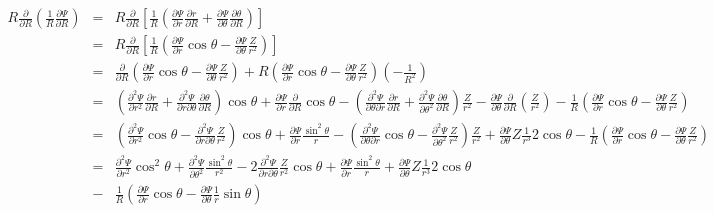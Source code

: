 \documentclass{llncs}
\begin{document}
\begin{eqnarray}
  R \frac{\partial}{\partial R} \left( \frac{1}{R} \frac{\partial
  \Psi}{\partial R} \right) & = & R \frac{\partial}{\partial R} \left[
  \frac{1}{R} \left( \frac{\partial \Psi}{\partial r}  \frac{\partial
  r}{\partial R} + \frac{\partial \Psi}{\partial \theta}  \frac{\partial
  \theta}{\partial R} \right) \right] \nonumber\\
  & = & R \frac{\partial}{\partial R} \left[ \frac{1}{R} \left(
  \frac{\partial \Psi}{\partial r} \cos \theta - \frac{\partial \Psi}{\partial
  \theta}  \frac{Z}{r^2} \right) \right] \nonumber\\
  & = & \frac{\partial}{\partial R} \left( \frac{\partial \Psi}{\partial r}
  \cos \theta - \frac{\partial \Psi}{\partial \theta}  \frac{Z}{r^2} \right) +
  R \left( \frac{\partial \Psi}{\partial r} \cos \theta - \frac{\partial
  \Psi}{\partial \theta}  \frac{Z}{r^2} \right) \left( - \frac{1}{R^2} \right)
  \nonumber\\
  & = & \left( \frac{\partial^2 \Psi}{\partial r^2} \frac{\partial
  r}{\partial R} + \frac{\partial^2 \Psi}{\partial r \partial \theta}
  \frac{\partial \theta}{\partial R} \right) \cos \theta + \frac{\partial
  \Psi}{\partial r} \frac{\partial}{\partial R} \cos \theta - \left(
  \frac{\partial^2 \Psi}{\partial \theta \partial r} \frac{\partial
  r}{\partial R} + \frac{\partial^2 \Psi}{\partial \theta^2} \frac{\partial
  \theta}{\partial R} \right) \frac{Z}{r^2} - \frac{\partial \Psi}{\partial
  \theta} \frac{\partial}{\partial R} \left( \frac{Z}{r^2} \right) -
  \frac{1}{R} \left( \frac{\partial \Psi}{\partial r} \cos \theta -
  \frac{\partial \Psi}{\partial \theta}  \frac{Z}{r^2} \right) \nonumber\\
  & = & \left( \frac{\partial^2 \Psi}{\partial r^2} \cos \theta -
  \frac{\partial^2 \Psi}{\partial r \partial \theta}  \frac{Z}{r^2} \right)
  \cos \theta + \frac{\partial \Psi}{\partial r}  \frac{\sin^2 \theta}{r} -
  \left( \frac{\partial^2 \Psi}{\partial \theta \partial r} \cos \theta -
  \frac{\partial^2 \Psi}{\partial \theta^2} \frac{Z}{r^2} \right)
  \frac{Z}{r^2} + \frac{\partial \Psi}{\partial \theta} Z \frac{1}{r^3} 2 \cos
  \theta - \frac{1}{R} \left( \frac{\partial \Psi}{\partial r} \cos \theta -
  \frac{\partial \Psi}{\partial \theta}  \frac{Z}{r^2} \right) \nonumber\\
  & = & \frac{\partial^2 \Psi}{\partial r^2} \cos^2 \theta + \frac{\partial^2
  \Psi}{\partial \theta^2}  \frac{\sin^2 \theta}{r^2} - 2 \frac{\partial^2
  \Psi}{\partial r \partial \theta}  \frac{Z}{r^2} \cos \theta +
  \frac{\partial \Psi}{\partial r}  \frac{\sin^2 \theta}{r} + \frac{\partial
  \Psi}{\partial \theta} Z \frac{1}{r^3} 2 \cos \theta  \label{9-17-e3}\\
  & - & \frac{1}{R} \left( \frac{\partial \Psi}{\partial r} \cos \theta -
  \frac{\partial \Psi}{\partial \theta}  \frac{1}{r} \sin \theta \right) 
\end{eqnarray}
\end{document}

